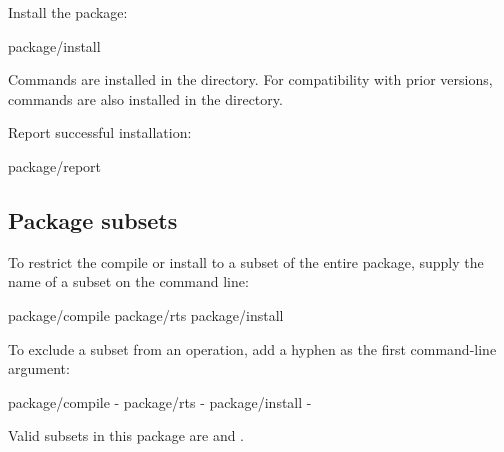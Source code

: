 \documentclass{book}
\begin{document}
Install the package:
\begin{code}%
  package/install
\end{code}

Commands are installed in the
 directory.
For compatibility with prior versions, commands are also installed in
the  directory.

Report successful installation:
\begin{code}%
  package/report
\end{code}


\subsection{Package subsets}
To restrict the compile or install to a subset of the entire package,
supply the name of a subset on the command line:
\begin{code}%
  package/compile 
  package/rts 
  package/install 
\end{code}

To exclude a subset from an operation, add a hyphen as the first
command-line argument:
\begin{code}%
  package/compile - 
  package/rts - 
  package/install - 
\end{code}

Valid subsets in this package are  and .
\end{document}
